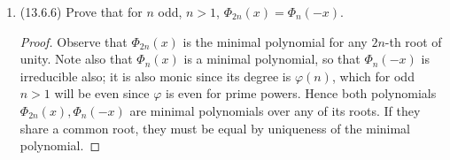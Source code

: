 \documentclass[11pt]{article}
\begin{document}
\begin{enumerate}
\begin{proof}
        Working in $\mathbb{F}_p$, we write $(1+x)^{pn}$ as $[(1+x)^{p}]^n = (1^p + x^p)^n = (1+x^p)^n = \sum_{k=0}^n\binom{n}{k}(x^p)^k$ so that the coefficient for $x^{pi} = (x^p)^i$ is $\binom{n}{i}$. Since both binomial expansions are valid for $(1+x)^{pn}$ in $\mathbb{F}_p$ it follows that $\binom{pn}{pi}\equiv \binom{n}{i}\pmod p$.
    \end{proof}
    \item (13.6.6) Prove that for $n$ odd, $n>1$, $\varPhi_{2n}(x) = \varPhi_n(-x)$. \begin{proof}
        Observe that $\varPhi_{2n}(x)$ is the minimal polynomial for any $2n$-th root of unity. Note also that $\varPhi_n(x)$ is a minimal polynomial, so that $\varPhi_n(-x)$ is irreducible also; it is also monic since its degree is $\varphi(n)$, which for odd $n>1$ will be even since $\varphi$ is even for prime powers. Hence both polynomials $\varPhi_{2n}(x), \varPhi_n(-x)$ are minimal polynomials over any of its roots. If they share a common root, they must be equal by uniqueness of the minimal polynomial.


\end{proof}
\end{enumerate}
\end{document}
